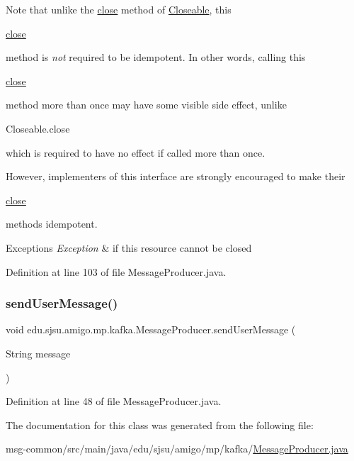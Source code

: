 Note that unlike the \hyperlink{}{close} method of \hyperlink{}{Closeable}, this
\begin{DoxyCode}
\hyperlink{classedu_1_1sjsu_1_1amigo_1_1mp_1_1kafka_1_1_message_producer_a0927f16496c80552219dc7abc01ae07c}{close} 
\end{DoxyCode}
 method is {\itshape not} required to be idempotent. In other words, calling this
\begin{DoxyCode}
\hyperlink{classedu_1_1sjsu_1_1amigo_1_1mp_1_1kafka_1_1_message_producer_a0927f16496c80552219dc7abc01ae07c}{close} 
\end{DoxyCode}
 method more than once may have some visible side effect, unlike
\begin{DoxyCode}
Closeable.close 
\end{DoxyCode}
 which is required to have no effect if called more than once. 

However, implementers of this interface are strongly encouraged to make their
\begin{DoxyCode}
\hyperlink{classedu_1_1sjsu_1_1amigo_1_1mp_1_1kafka_1_1_message_producer_a0927f16496c80552219dc7abc01ae07c}{close} 
\end{DoxyCode}
 methods idempotent.


\begin{DoxyExceptions}{Exceptions}
{\em Exception} & if this resource cannot be closed \\
\hline
\end{DoxyExceptions}


Definition at line 103 of file Message\+Producer.\+java.

\mbox{\label{classedu_1_1sjsu_1_1amigo_1_1mp_1_1kafka_1_1_message_producer_a2adcbe52df5a05cfd7d96a09756de9de}} 
\subsubsection{\texorpdfstring{send\+User\+Message()}{sendUserMessage()}}
{\footnotesize\ttfamily void edu.\+sjsu.\+amigo.\+mp.\+kafka.\+Message\+Producer.\+send\+User\+Message (\begin{DoxyParamCaption}\item[{String}]{message }\end{DoxyParamCaption})}



Definition at line 48 of file Message\+Producer.\+java.



The documentation for this class was generated from the following file\+:\begin{DoxyCompactItemize}
\item 
msg-\/common/src/main/java/edu/sjsu/amigo/mp/kafka/\hyperlink{_message_producer_8java}{Message\+Producer.\+java}\end{DoxyCompactItemize}
